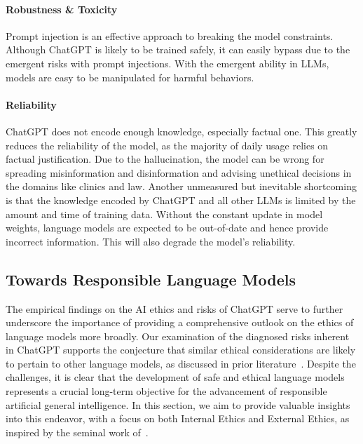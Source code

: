 \paragraph{Robustness \& Toxicity} Prompt injection is an effective approach to breaking the model constraints. Although ChatGPT is likely to be trained safely, it can easily bypass due to the emergent risks with prompt injections. With the emergent ability in LLMs, models are easy to be manipulated for harmful behaviors.

\paragraph{Reliability} ChatGPT does not encode enough knowledge, especially factual one. This greatly reduces the reliability of the model, as the majority of daily usage relies on factual justification. Due to the hallucination, the model can be wrong for spreading misinformation and disinformation and advising unethical decisions in the domains like clinics and law. Another unmeasured but inevitable shortcoming is that the knowledge encoded by ChatGPT and all other LLMs is limited by the amount and time of training data. Without the constant update in model weights, language models are expected to be out-of-date and hence provide incorrect information. This will also degrade the model's reliability.

\subsection{Towards Responsible Language Models}
The empirical findings on the AI ethics and risks of ChatGPT serve to further underscore the importance of providing a comprehensive outlook on the ethics of language models more broadly. Our examination of the diagnosed risks inherent in ChatGPT supports the conjecture that similar ethical considerations are likely to pertain to other language models, as discussed in prior literature~\cite{goldstein2023generative, weidinger2021ethical}. Despite the challenges, it is clear that the development of safe and ethical language models represents a crucial long-term objective for the advancement of responsible artificial general intelligence. In this section, we aim to provide valuable insights into this endeavor, with a focus on both Internal Ethics and External Ethics, as inspired by the seminal work of~\cite{llm-remarks}.

